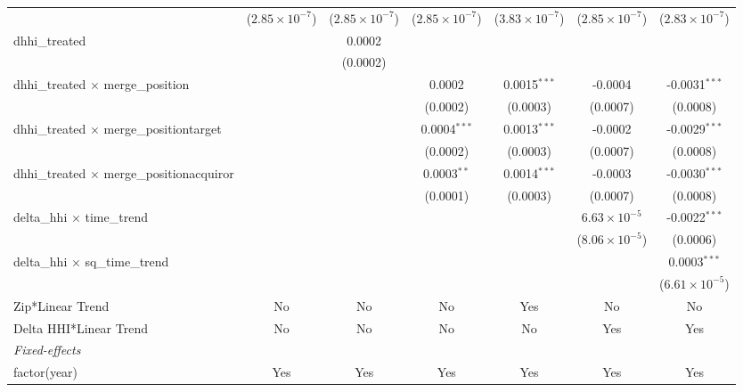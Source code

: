 \begin{table}[H]
{\begin{tabular}{lcccccc}
   &($2.85\times 10^{-7}$) & ($2.85\times 10^{-7}$) & ($2.85\times 10^{-7}$) & ($3.83\times 10^{-7}$) & ($2.85\times 10^{-7}$) & ($2.83\times 10^{-7}$)\\ 

 dhhi\_treated&   & 0.0002 &    &    &    &   \\ 

   &   & (0.0002) &    &    &    &   \\ 

 dhhi\_treated $\times $ merge\_position&   &    & 0.0002 & 0.0015$^{***}$ & -0.0004 & -0.0031$^{***}$\\ 

   &   &    & (0.0002) & (0.0003) & (0.0007) & (0.0008)\\ 

 dhhi\_treated $\times $ merge\_positiontarget&   &    & 0.0004$^{***}$ & 0.0013$^{***}$ & -0.0002 & -0.0029$^{***}$\\ 

   &   &    & (0.0002) & (0.0003) & (0.0007) & (0.0008)\\ 

 dhhi\_treated $\times $ merge\_positionacquiror&   &    & 0.0003$^{**}$ & 0.0014$^{***}$ & -0.0003 & -0.0030$^{***}$\\ 

   &   &    & (0.0001) & (0.0003) & (0.0007) & (0.0008)\\ 

 delta\_hhi $\times $ time\_trend&   &    &    &    & $6.63\times 10^{-5}$ & -0.0022$^{***}$\\ 

   &   &    &    &    & ($8.06\times 10^{-5}$) & (0.0006)\\ 

 delta\_hhi $\times $ sq\_time\_trend&   &    &    &    &    & 0.0003$^{***}$\\ 

   &   &    &    &    &    & ($6.61\times 10^{-5}$)\\ 

 Zip*Linear Trend & No & No & No & Yes & No & No\\ 

 Delta HHI*Linear Trend & No & No & No & No & Yes & Yes\\ 

 \midrule \emph{Fixed-effects}&   &   &   &   &   &  \\ 

 factor(year) & Yes & Yes & Yes & Yes & Yes & Yes\\ 


\end{tabular}}
\end{table}

